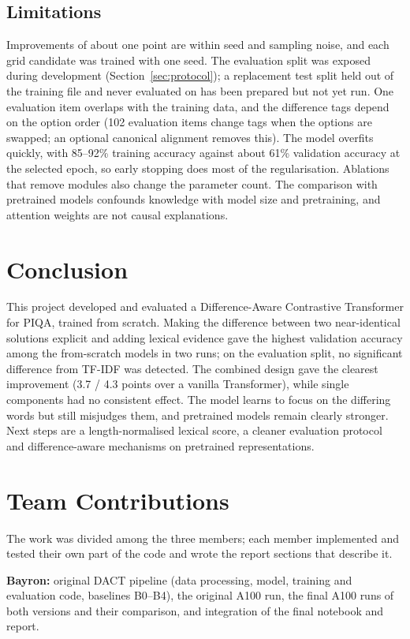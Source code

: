 \documentclass[11pt]{article}
\begin{document}
\subsection{Limitations}\label{sec:limits}
Improvements of about one point are within seed and sampling noise, and each grid candidate was trained with one seed. The evaluation split was exposed during development (Section~\ref{sec:protocol}); a replacement test split held out of the training file and never evaluated on has been prepared but not yet run. One evaluation item overlaps with the training data, and the difference tags depend on the option order (102 evaluation items change tags when the options are swapped; an optional canonical alignment removes this). The model overfits quickly, with 85--92\% training accuracy against about 61\% validation accuracy at the selected epoch, so early stopping does most of the regularisation. Ablations that remove modules also change the parameter count. The comparison with pretrained models confounds knowledge with model size and pretraining, and attention weights are not causal explanations.

\section{Conclusion}
This project developed and evaluated a Difference-Aware Contrastive Transformer for PIQA, trained from scratch. Making the difference between two near-identical solutions explicit and adding lexical evidence gave the highest validation accuracy among the from-scratch models in two runs; on the evaluation split, no significant difference from TF-IDF was detected. The combined design gave the clearest improvement (3.7 / 4.3 points over a vanilla Transformer), while single components had no consistent effect. The model learns to focus on the differing words but still misjudges them, and pretrained models remain clearly stronger. Next steps are a length-normalised lexical score, a cleaner evaluation protocol and difference-aware mechanisms on pretrained representations.

\section*{Team Contributions}
The work was divided among the three members; each member implemented and tested their own part of the code and wrote the report sections that describe it.

\textbf{Bayron:} original DACT pipeline (data processing, model, training and evaluation code, baselines B0--B4), the original A100 run, the final A100 runs of both versions and their comparison, and integration of the final notebook and report.
\end{document}
